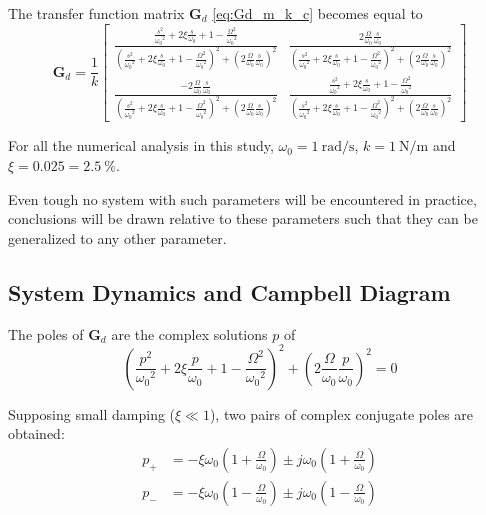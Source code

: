 \documentclass{ISMA_USD2020}
\begin{document}
The transfer function matrix \(\bm{G}_d\) \eqref{eq:Gd_m_k_c} becomes equal to
\begin{equation}
\label{eq:Gd_w0_xi_k}
\bm{G}_{d} =
  \frac{1}{k}
  \begin{bmatrix}
    \frac{\frac{s^2}{{\omega_0}^2} + 2 \xi \frac{s}{\omega_0} + 1 - \frac{{\Omega}^2}{{\omega_0}^2}}{\left( \frac{s^2}{{\omega_0}^2} + 2 \xi \frac{s}{\omega_0} + 1 - \frac{{\Omega}^2}{{\omega_0}^2} \right)^2 + \left( 2 \frac{\Omega}{\omega_0} \frac{s}{\omega_0} \right)^2} & \frac{2 \frac{\Omega}{\omega_0} \frac{s}{\omega_0}}{\left( \frac{s^2}{{\omega_0}^2} + 2 \xi \frac{s}{\omega_0} + 1 - \frac{{\Omega}^2}{{\omega_0}^2} \right)^2 + \left( 2 \frac{\Omega}{\omega_0} \frac{s}{\omega_0} \right)^2} \\
    \frac{- 2 \frac{\Omega}{\omega_0} \frac{s}{\omega_0}}{\left( \frac{s^2}{{\omega_0}^2} + 2 \xi \frac{s}{\omega_0} + 1 - \frac{{\Omega}^2}{{\omega_0}^2} \right)^2 + \left( 2 \frac{\Omega}{\omega_0} \frac{s}{\omega_0} \right)^2} & \frac{\frac{s^2}{{\omega_0}^2} + 2 \xi \frac{s}{\omega_0} + 1 - \frac{{\Omega}^2}{{\omega_0}^2}}{\left( \frac{s^2}{{\omega_0}^2} + 2 \xi \frac{s}{\omega_0} + 1 - \frac{{\Omega}^2}{{\omega_0}^2} \right)^2 + \left( 2 \frac{\Omega}{\omega_0} \frac{s}{\omega_0} \right)^2}
  \end{bmatrix}
\end{equation}

For all the numerical analysis in this study, \(\omega_0 = \SI{1}{\radian\per\second}\), \(k = \SI{1}{\newton\per\meter}\) and \(\xi = 0.025 = \SI{2.5}{\percent}\).

Even tough no system with such parameters will be encountered in practice, conclusions will be drawn relative to these parameters such that they can be generalized to any other parameter.

\subsection{System Dynamics and Campbell Diagram}
\label{sec:orge52a4e9}
The poles of \(\bm{G}_d\) are the complex solutions \(p\) of
\begin{equation}
  \left( \frac{p^2}{{\omega_0}^2} + 2 \xi \frac{p}{\omega_0} + 1 - \frac{{\Omega}^2}{{\omega_0}^2} \right)^2 + \left( 2 \frac{\Omega}{\omega_0} \frac{p}{\omega_0} \right)^2 = 0
\end{equation}

Supposing small damping (\(\xi \ll 1\)), two pairs of complex conjugate poles are obtained:
\begin{subequations}
\label{eq:pole_values}
  \begin{align}
    p_{+} &= - \xi \omega_0 \left( 1 + \frac{\Omega}{\omega_0} \right) \pm j \omega_0 \left( 1 + \frac{\Omega}{\omega_0} \right) \\
    p_{-} &= - \xi \omega_0 \left( 1 - \frac{\Omega}{\omega_0} \right) \pm j \omega_0 \left( 1 - \frac{\Omega}{\omega_0} \right)
  \end{align}
\end{subequations}
\end{document}
